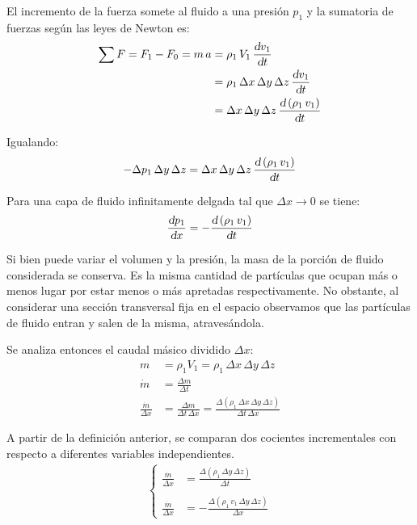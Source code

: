 \documentclass[a5paper,12pt,twoside]{book}
\begin{document}
El incremento de la fuerza somete al fluido a una presión $p_1$ y la sumatoria de fuerzas según las leyes de Newton es:
\begin{align*}
    \sum F = F_1 - F_0  = m \, a &= \rho_1 \, V_1 \, \frac{\textsl{d} v_1}{\textsl{d} t}
    \\
    &= \rho_1 \, \Delta x \, \Delta y \, \Delta z \, \frac{\textsl{d} v_1}{\textsl{d} t}
    \\
    &= \Delta x \, \Delta y \, \Delta z \, \frac{\textsl{d} \left( \rho_1 \, v_1 \right)}{\textsl{d} t}
\end{align*}

Igualando:
\begin{equation}
    - \Delta p_1 \, \Delta y \, \Delta z
    =
    \Delta x \, \Delta y \, \Delta z \, \frac{\textsl{d} \left( \rho_1 \, v_1 \right)}{\textsl{d} t}
    \label{eqn:momentumDelta}
\end{equation}

Para una capa de fluido infinitamente delgada tal que $\Delta x \to 0$ se tiene:
\begin{equation}
    \frac{\textsl{d} p_1}{\textsl{d} x} = - \frac{\textsl{d} \left( \rho_1 \, v_1 \right)}{\textsl{d} t}
    \label{eqn:momentumDif}
\end{equation}

Si bien puede variar el volumen y la presión, la masa de la porción de fluido considerada se conserva. Es la misma cantidad de partículas que ocupan más o menos lugar por estar menos o más apretadas respectivamente. No obstante, al considerar una sección transversal fija en el espacio observamos que las partículas de fluido entran y salen de la misma, atravesándola.

Se analiza entonces el caudal másico dividido $\Delta x$:
\begin{align*}
    m &= \rho_1 V_1 = \rho_1 \, \Delta x \, \Delta y \, \Delta z
    \\
    \dot{m} &= \frac{\Delta m}{\Delta t}
    \\
    \frac{\dot{m}}{\Delta x} &= \frac{\Delta m}{\Delta t \, \Delta x}
    = \frac{\Delta \left( \rho_1 \, \Delta x \, \Delta y \, \Delta z \right)}{\Delta t \, \Delta x}
\end{align*}

A partir de la definición anterior, se comparan dos cocientes incrementales con respecto a diferentes variables independientes.
\begin{gather*}
    \left\{
    \begin{aligned}
        \frac{\dot{m}}{\Delta x} &= \frac{\Delta \left( \rho_1 \, \Delta y \, \Delta z \right)}{\Delta t}
        \\
        \\
        \frac{\dot{m}}{\Delta x} &= -\frac{\Delta \left( \rho_1 \, v_1 \, \Delta y \, \Delta z \right)}{\Delta x}
    \end{aligned}
    \right.
\end{gather*}
\end{document}
